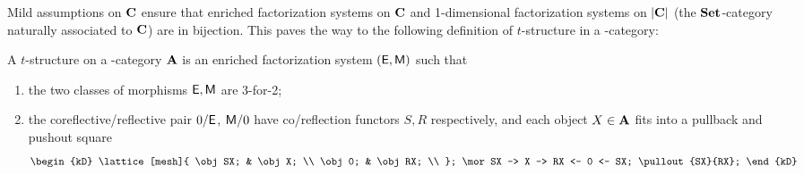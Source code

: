 Mild assumptions on $\mathbf{C}$ ensure that enriched factorization systems on $\mathbf{C}$ and 1\hyp{}dimensional factorization systems on $|\mathbf{C}|$ (the $\mathbf{Set}$\hyp{}category naturally associated to $\mathbf{C}$) are in bijection. This paves the way to the following definition of $t$\hyp{}structure in a \hyp{}category:
\begin{definition}
A $t$\hyp{}structure on a \dg\hyp{}category $\mathbf{A}$ is an enriched factorization system $(\mathsf{E},\mathsf{M})$ such that
\begin{enumerate}
\item the two classes of morphisms $\mathsf{E},\mathsf{M}$ are 3\hyp{}for\hyp{}2;
\item the coreflective\fshyp{}reflective pair $0/\mathsf{E}$, $\mathsf{M}/0$ have co\fshyp{}reflection functors $S,R$ respectively, and each object $X\in\mathbf{A}$ fits into a pullback and pushout square
\[
\begin{kD}
\lattice[mesh]{
\obj SX; & \obj X; \\
\obj 0; & \obj RX; \\
};
\mor SX -> X -> RX <- 0 <- SX;
\pullout{SX}{RX};
\end{kD}
\]
\end{enumerate}
\end{definition}
